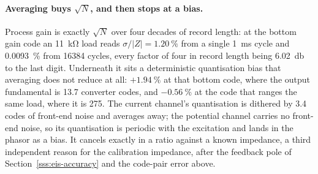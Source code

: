 \paragraph{Averaging buys \(\sqrt{N}\), and then stops at a bias.} Process gain
is exactly \(\sqrt{N}\) over four decades of record length: at the bottom gain
code an \SI{11}{\kilo\ohm} load reads \(\sigma/|Z| = \SI{1.20}{\percent}\) from
a single \SI{1}{\milli\second} cycle and \SI{0.0093}{\percent} from
\num{16384} cycles, every factor of four in record length being
\SI{6.02}{\decibel} to the last digit. Underneath it sits a deterministic
quantisation bias that averaging does not reduce at all: \(+\SI{1.94}{\percent}\)
at that bottom code, where the output fundamental is \num{13.7} converter codes,
and \(-\SI{0.56}{\percent}\) at the code that ranges the same load, where it is
\num{275}. The current channel's quantisation is dithered by \num{3.4} codes of
front-end noise and averages away; the potential channel carries no front-end
noise, so its quantisation is periodic with the excitation and lands in the
phasor as a bias. It cancels exactly in a ratio against a known impedance, a
third independent reason for the calibration impedance, after the feedback pole
of Section~\ref{sss:eis-accuracy} and the code-pair error above.

